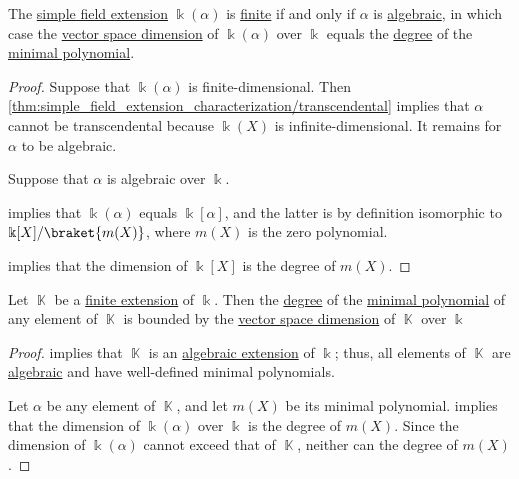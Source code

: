 \begin{proposition}\label{thm:simple_extension_degree}
  The \hyperref[def:simple_field_extension]{simple field extension} \( \Bbbk(\alpha) \) is \hyperref[def:field_extension_degree]{finite} if and only if \( \alpha \) is \hyperref[def:algebraic_element]{algebraic}, in which case the \hyperref[def:vector_space_dimension]{vector space dimension} of \( \Bbbk(\alpha) \) over \( \Bbbk \) equals the \hyperref[def:polynomial_degree]{degree} of the \hyperref[def:algebraic_element_minimal_polynomial]{minimal polynomial}.
\end{proposition}
\begin{proof}
  \SufficiencySubProof Suppose that \( \Bbbk(\alpha) \) is finite-dimensional. Then \cref{thm:simple_field_extension_characterization/transcendental} implies that \( \alpha \) cannot be transcendental because \( \Bbbk(X) \) is infinite-dimensional. It remains for \( \alpha \) to be algebraic.

  \NecessitySubProof Suppose that \( \alpha \) is algebraic over \( \Bbbk \).

   implies that \( \Bbbk(\alpha) \) equals \( \Bbbk[\alpha] \), and the latter is by definition isomorphic to \( \Bbbk[X] / \braket{ m(X) } \), where \( m(X) \) is the zero polynomial.

   implies that the dimension of \( \Bbbk[X] \) is the degree of \( m(X) \).
\end{proof}

\begin{corollary}\label{thm:finite_extension_degree_bound}
  Let \( \BbbK \) be a \hyperref[thm:finite_field_extensions_are_algebraic]{finite extension} of \( \Bbbk \). Then the \hyperref[def:polynomial_degree]{degree} of the \hyperref[def:algebraic_element_minimal_polynomial]{minimal polynomial} of any element of \( \BbbK \) is bounded by the \hyperref[def:vector_space_dimension]{vector space dimension} of \( \BbbK \) over \( \Bbbk \)
\end{corollary}
\begin{proof}
   implies that \( \BbbK \) is an \hyperref[def:algebraic_extension]{algebraic extension} of \( \Bbbk \); thus, all elements of \( \BbbK \) are \hyperref[def:algebraic_element]{algebraic} and have well-defined minimal polynomials.

  Let \( \alpha \) be any element of \( \BbbK \), and let \( m(X) \) be its minimal polynomial.  implies that the dimension of \( \Bbbk(\alpha) \) over \( \Bbbk \) is the degree of \( m(X) \). Since the dimension of \( \Bbbk(\alpha) \) cannot exceed that of \( \BbbK \), neither can the degree of \( m(X) \).
\end{proof}

